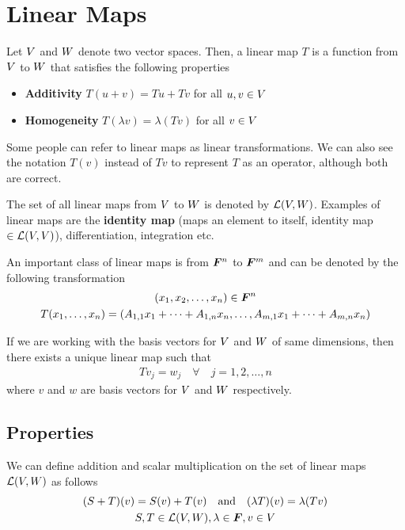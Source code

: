 \documentclass[../../linear_algebra.tex]{subfiles}
\begin{document}
\section{Linear Maps}
Let $V$ and $W$ denote two vector spaces. Then, a linear map $T$ is a function from $V$ to $W$ that satisfies the following properties
\begin{itemize}
    \item \textbf{Additivity}\newline
    $T(u + v) = Tu + Tv$ for all $u,v \in V$
    \item \textbf{Homogeneity}\newline
    $T(\lambda v) = \lambda(Tv)$ for all $v \in V$
\end{itemize}
Some people can refer to linear maps as linear transformations. We can also see the notation $T(v)$ instead of $Tv$ to represent $T$ as an operator, although both are correct.\newline

The set of all linear maps from $V$ to $W$ is denoted by $\mathcal{L}(V, W)$. Examples of linear maps are the \textbf{identity map} (maps an element to itself, identity map $\in \mathcal{L}(V, V)$), differentiation, integration etc.\newline

An important class of linear maps is from $\bm{F}^{n}$ to $\bm{F}^{m}$ and can be denoted by the following transformation
\begin{gather*}
(x_{1}, x_{2}, \ldots, x_{n}) \in \bm{F}^{n}\\
    T(x_{1}, \ldots, x_{n}) = (A_{1,1}x_{1} + \cdots + A_{1,n}x_{n}, \ldots, A_{m,1}x_{1} + \cdots + A_{m,n}x_{n})
\end{gather*}

If we are working with the basis vectors for $V$ and $W$ of same dimensions, then there exists a unique linear map such that 
\begin{align*}
    Tv_{j} = w_{j} \quad \forall \quad j = 1,2,\ldots,n
\end{align*}
where $v$ and $w$ are basis vectors for $V$ and $W$ respectively.

\subsection{Properties}
We can define addition and scalar multiplication on the set of linear maps $\mathcal{L}(V, W)$ as follows
\begin{gather*}
    (S + T)(v) = S(v) + T(v) \quad \text{and} \quad (\lambda T)(v) = \lambda(Tv)\\
    S,T \in \mathcal{L}(V, W), \lambda \in \bm{F}, v \in V
\end{gather*}
\end{document}
